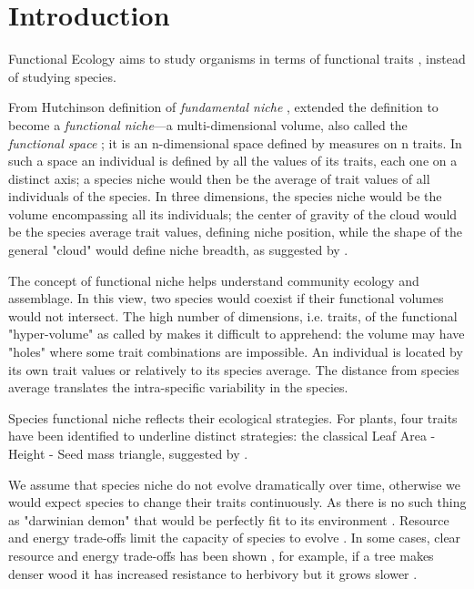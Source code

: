 \label{sec:Intro}
\section*{Introduction}
Functional Ecology aims to study organisms in terms of functional traits \cite{NEEDED}, instead of studying species.

From Hutchinson definition of \emph{fundamental niche} \citep{hutchinson_concluding_1957}, \citet{violle_towards_2009} extended the definition to become a \emph{functional niche}—a multi-dimensional volume, also called the \emph{functional space} ; it is an n-dimensional space defined by measures on n traits. In such a space an individual is defined by all the values of its traits, each one on a distinct axis;  a species niche would then be the average of trait values of all individuals of the species. In three dimensions, the species niche would be the volume encompassing all its individuals; the center of gravity of the cloud would be the species average trait values, defining niche position, while the shape of the general "cloud" would define niche breadth, as suggested by \citet{violle_towards_2009}.

The concept of functional niche helps understand community ecology and assemblage. In this view, two species would coexist if their functional volumes would not intersect. The high number of dimensions, i.e. traits, of the functional "hyper-volume" as called by \cite{NEEDED} makes it difficult to apprehend: the volume may have "holes" where some trait combinations are impossible. An individual is located by its own trait values or relatively to its species average. The distance from species average translates the intra-specific variability in the species.

Species functional niche reflects their ecological strategies. For plants, four traits have been identified to underline distinct strategies: the classical Leaf Area - Height - Seed mass triangle, suggested by \cite{NEEDED}.

We assume that species niche do not evolve dramatically over time, otherwise we would expect species to change their traits continuously. As there is no such thing as "darwinian demon" that would be perfectly fit to its environment \cite{NEEDED}. Resource and energy trade-offs limit the capacity of species to evolve \cite{NEEDED}. In some cases, clear resource and energy trade-offs has been shown \cite{NEEDED}, for example, if a tree makes denser wood it has increased resistance to herbivory but it grows slower \citep{baraloto_decoupled_2010}.

